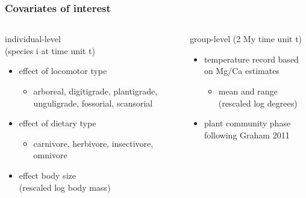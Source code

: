 \documentclass{beamer}
\begin{document}
\begin{frame}
  \frametitle{Covariates of interest}
  \begin{columns}
    \begin{column}{0.5\textwidth}
      individual-level \\(species i at time unit t)
      \begin{itemize}
        \item effect of locomotor type
          \begin{itemize}
            \item arboreal, digitigrade, plantigrade, unguligrade, fossorial, scansorial
          \end{itemize}
        \item effect of dietary type
          \begin{itemize}
            \item carnivore, herbivore, insectivore, omnivore
          \end{itemize}
        \item effect body size \\(rescaled log body mass)
      \end{itemize}
    \end{column}
    \begin{column}{0.5\textwidth}
      group-level (2 My time unit t)
      \begin{itemize}
        \item temperature record based on Mg/Ca estimates
          \begin{itemize}
            \item mean and range \\(rescaled log degrees)
          \end{itemize}
        \item plant community phase following Graham 2011
      \end{itemize}
    \end{column}
  \end{columns}
\end{frame}
\end{document}
